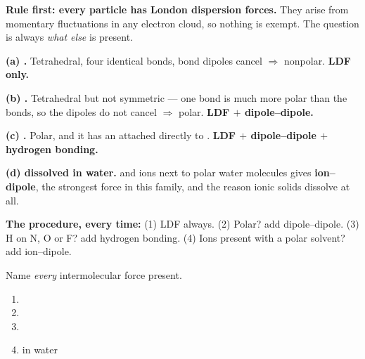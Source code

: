 \documentclass{apchem-worksheet}
\begin{document}
\begin{workedexample}
\textbf{Rule first: every particle has London dispersion forces.} They
arise from momentary fluctuations in any electron cloud, so nothing is
exempt. The question is always \emph{what else} is present.

\textbf{(a) .} Tetrahedral, four identical  bonds, bond
dipoles cancel $\Rightarrow$ nonpolar. \textbf{LDF only.}

\textbf{(b) .} Tetrahedral but not symmetric --- one 
bond is much more polar than the  bonds, so the dipoles do not
cancel $\Rightarrow$ polar. \textbf{LDF $+$ dipole--dipole.}

\textbf{(c) .} Polar, and it has an  attached directly to
. \textbf{LDF $+$ dipole--dipole $+$ hydrogen bonding.}

\textbf{(d)  dissolved in water.}  and  ions
next to polar water molecules gives \textbf{ion--dipole}, the strongest
force in this family, and the reason ionic solids dissolve at all.

\textbf{The procedure, every time:} (1) LDF always. (2) Polar? add
dipole--dipole. (3) H on N, O or F? add hydrogen bonding. (4) Ions
present with a polar solvent? add ion--dipole.
\end{workedexample}

\begin{yourturn}
Name \emph{every} intermolecular force present.
\begin{enumerate}[leftmargin=*,itemsep=0.5em]
  \item {} \workspace[1.4cm]
  \item {} \workspace[1.4cm]
  \item {} \workspace[1.4cm]
  \item {} in water \workspace[1.6cm]
\end{enumerate}
\end{yourturn}
\end{document}
